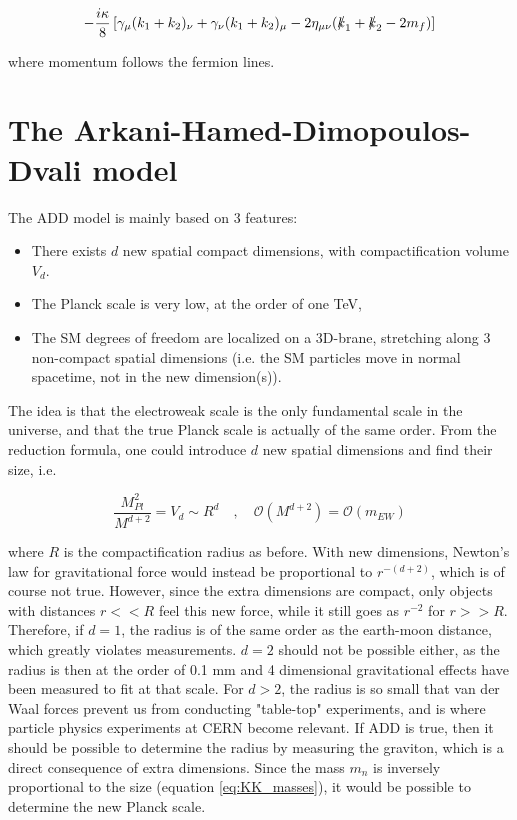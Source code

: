 \documentclass[11pt,a4paper]{article}
\begin{document}
\begin{equation}
	-\frac{i\kappa}{8}\left[\gamma_\mu(k_1 + k_2)_ \nu + \gamma_\nu(k_1+k_2)_\mu - 2\eta_{\mu\nu}(\slashed k_1 + \slashed k_2 - 2m_f)\right]
	\label{eq:Gcoupling}
\end{equation}

where momentum follows the fermion lines. 

\section{The Arkani-Hamed-Dimopoulos-Dvali model}
The ADD model is mainly based on 3 features:

\begin{itemize}
	\item There exists $d$ new spatial compact dimensions, with compactification volume $V_d$.
	\item The Planck scale is very low, at the order of one TeV,
	\item The SM degrees of freedom are localized on a 3D-brane, stretching along 3 non-compact spatial dimensions (i.e. the SM particles move in normal spacetime, not in the new dimension(s)).
\end{itemize}

The idea is that the electroweak scale is the only fundamental scale in the universe, and that the true Planck scale is actually of the same order. From the reduction formula, one could introduce $d$ new spatial dimensions and find their size, i.e.

\begin{equation}
	\frac{M_{Pl}^2}{M^{d+2}} = V_d \sim R^d	\quad,\quad \mathcal{O}(M^{d+2}) = \mathcal{O}(m_{EW})
\end{equation}

where $R$ is the compactification radius as before. With new dimensions, Newton's law for gravitational force would instead be proportional to $r^{-(d+2)}$, which is of course not true. However, since the extra dimensions are compact, only objects with distances $r<<R$ feel this new force, while it still goes as $r^{-2}$ for $r>>R$. Therefore, if $d=1$, the radius is of the same order as the earth-moon distance, which greatly violates measurements. $d=2$ should not be possible either, as the radius is then at the order of 0.1 mm and 4 dimensional gravitational effects have been measured to fit at that scale. For $d>2$, the radius is so small that van der Waal forces prevent us from conducting "table-top" experiments, and is where particle physics experiments at CERN become relevant. If ADD is true, then it should be possible to determine the radius by measuring the graviton, which is a direct consequence of extra dimensions. Since the mass $m_n$ is inversely proportional to the size (equation \ref{eq:KK_masses}), it would be possible to determine the new Planck scale.
\end{document}
